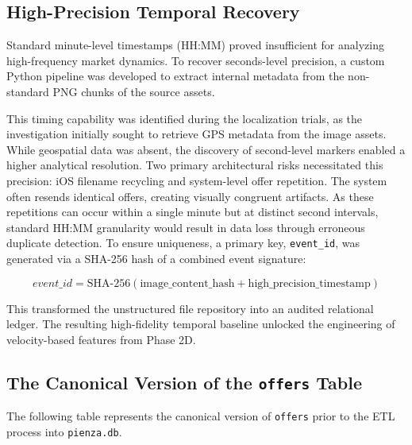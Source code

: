 \subsection{High-Precision Temporal Recovery}
Standard minute-level timestamps (HH:MM) proved insufficient for analyzing high-frequency market dynamics. To recover seconds-level precision, a custom Python pipeline was developed to extract internal metadata from the non-standard PNG chunks of the source assets. 

This timing capability was identified during the localization trials, as the investigation initially sought to retrieve GPS metadata from the image assets. While geospatial data was absent, the discovery of second-level markers enabled a higher analytical resolution. Two primary architectural risks necessitated this precision: iOS filename recycling and system-level offer repetition. The system often resends identical offers, creating visually congruent artifacts. As these repetitions can occur within a single minute but at distinct second intervals, standard HH:MM granularity would result in data loss through erroneous duplicate detection. To ensure uniqueness, a primary key, \texttt{event\_id}, was generated via a SHA-256 hash of a combined event signature:

\begin{equation}
    event\_id = \text{SHA-256}(\text{image\_content\_hash} + \text{high\_precision\_timestamp})
\end{equation}

This transformed the unstructured file repository into an audited relational ledger. The resulting high-fidelity temporal baseline unlocked the engineering of velocity-based features from Phase 2D.




\subsection{The Canonical Version of the \texttt{offers} Table}
The following table represents the canonical version of \texttt{offers} prior to the ETL process into \texttt{pienza.db}.

